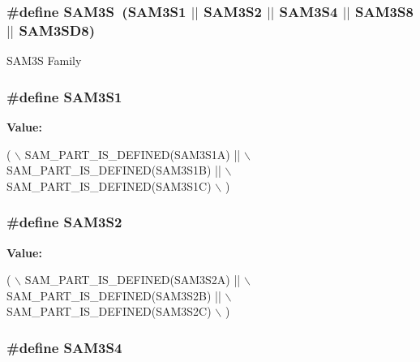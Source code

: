 \hypertarget{group__sam__part__macros__group_gaaa8d9ee5981c67997fbdf923247bcb68}{
\subsubsection[{S\-A\-M3\-S}]{\setlength{\rightskip}{0pt plus 5cm}\#define S\-A\-M3\-S~({\bf S\-A\-M3\-S1} $|$$|$ {\bf S\-A\-M3\-S2} $|$$|$ {\bf S\-A\-M3\-S4} $|$$|$ {\bf S\-A\-M3\-S8} $|$$|$ {\bf S\-A\-M3\-S\-D8})}}\label{group__sam__part__macros__group_gaaa8d9ee5981c67997fbdf923247bcb68}
S\-A\-M3\-S Family \hypertarget{group__sam__part__macros__group_gac1f138c6fe48b20faa71fb2d68d68b52}{
\subsubsection[{S\-A\-M3\-S1}]{\setlength{\rightskip}{0pt plus 5cm}\#define S\-A\-M3\-S1}}\label{group__sam__part__macros__group_gac1f138c6fe48b20faa71fb2d68d68b52}
{\bfseries Value\-:}
\begin{DoxyCode}
( \(\backslash\)
        SAM\_PART\_IS\_DEFINED(SAM3S1A) || \(\backslash\)
        SAM\_PART\_IS\_DEFINED(SAM3S1B) || \(\backslash\)
        SAM\_PART\_IS\_DEFINED(SAM3S1C) \(\backslash\)
        )
\end{DoxyCode}
\hypertarget{group__sam__part__macros__group_ga3665c1cc7fa5ad33231fde9e16b562cd}{
\subsubsection[{S\-A\-M3\-S2}]{\setlength{\rightskip}{0pt plus 5cm}\#define S\-A\-M3\-S2}}\label{group__sam__part__macros__group_ga3665c1cc7fa5ad33231fde9e16b562cd}
{\bfseries Value\-:}
\begin{DoxyCode}
( \(\backslash\)
        SAM\_PART\_IS\_DEFINED(SAM3S2A) || \(\backslash\)
        SAM\_PART\_IS\_DEFINED(SAM3S2B) || \(\backslash\)
        SAM\_PART\_IS\_DEFINED(SAM3S2C) \(\backslash\)
        )
\end{DoxyCode}
\hypertarget{group__sam__part__macros__group_gae92413f616568bd2f38622e20f4925e0}{
\subsubsection[{S\-A\-M3\-S4}]{\setlength{\rightskip}{0pt plus 5cm}\#define S\-A\-M3\-S4}}\label{group__sam__part__macros__group_gae92413f616568bd2f38622e20f4925e0}
